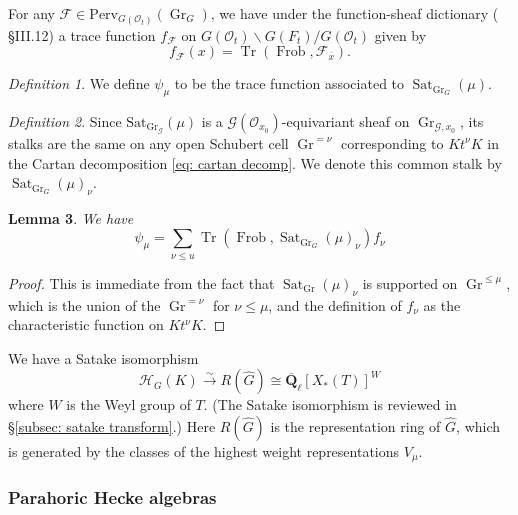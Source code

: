 \documentclass[reqno]{amsart}
\numberwithin{equation}{section}
\newcommand{\Q}{\mathbf{Q}}
\newcommand{\ol}[1]{\overline{#1}}
\newcommand{\wh}[1]{\widehat{#1}}
\newcommand{\Cal}[1]{\mathcal{#1}}
\newcommand{\mrm}[1]{\mathrm{#1}}
\newcommand{\bs}{\backslash}
\DeclareMathOperator{\Frob}{Frob}
\DeclareMathOperator{\Tr}{Tr}
\DeclareMathOperator{\Gr}{Gr}
\DeclareMathOperator{\Sat}{Sat}
\newtheorem{thm}{Theorem}[section]
\newtheorem{lemma}[thm]{Lemma}
\theoremstyle{remark}
\newtheorem{defn}[thm]{Definition}
\numberwithin{equation}{section}
\begin{document}
For any $\Cal{F} \in \mrm{Perv}_{G(\Cal{O}_t)} (\Gr_G)$, we have under the function-sheaf dictionary (\cite{KW01} \S III.12) a trace function $f_{\Cal{F}}$ on $G(\Cal{O}_t) \bs G(F_t)/G(\Cal{O}_t)$ given by 
\begin{equation}\label{eq: trace function}
f_{\Cal{F}}(x) = \Tr(\Frob, \Cal{F}_{\ol{x}}).
\end{equation}

\begin{defn}
We define $\psi_{\mu}$ to be the trace function associated to $\Sat_{\Gr_G}(\mu)$. 
 \end{defn}
 
 

\begin{defn}Since $\mrm{Sat}_{\Gr_{\Cal{G}}}(\mu)$ is a $\Cal{G}(\Cal{O}_{x_0})$-equivariant sheaf on $\Gr_{\Cal{G},x_0}$, its stalks are the same on any open Schubert cell $\Gr^{= \nu}$ corresponding to $Kt^{\nu} K$ in the Cartan decomposition \eqref{eq: cartan decomp}. We denote this common stalk by $\Sat_{\Gr_G}(\mu)_{\nu}$. 
\end{defn}

 
\begin{lemma}\label{lem: spherical hecke formula}
We have 
\[
\psi_{\mu} = \sum_{\nu \leq u} \Tr(\Frob, \Sat_{\Gr_G}(\mu)_{\nu}) f_{\nu}
\]
\end{lemma}

\begin{proof}
This is immediate from the fact that $\Sat_{\Gr}(\mu)_{\nu}$ is supported on $\Gr^{\leq \mu}$, which is the union of the $\Gr^{= \nu}$ for $\nu \leq \mu$, and the definition of $f_{\nu}$ as the characteristic function on $K t^{\nu} K$.  
\end{proof}

 
 We have a Satake isomorphism 
 \[
 \Cal{H}_G(K) \xrightarrow{\sim} R(\wh{G}) \cong  \ol{\Q}_{\ell}[X_*(T)]^W
 \]
 where $W$ is the Weyl group of $T$. (The Satake isomorphism is reviewed in \S \ref{subsec: satake transform}.) Here $R(\wh{G})$ is the representation ring of $\wh{G}$, which is generated by the classes of the highest weight representations $V_{\mu}$. 





\subsubsection{Parahoric Hecke algebras}
\end{document}
